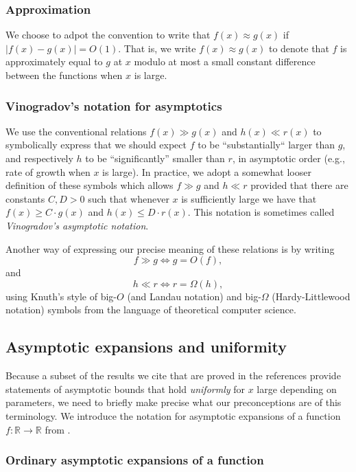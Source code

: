 \documentclass[11pt,reqno,a4letter]{article}
\numberwithin{figure}{section}
\numberwithin{table}{section}
\theoremstyle{plain}
\numberwithin{theorem}{section}
\theoremstyle{definition}
\begin{document}
\subsubsection{Approximation} 
     
We choose to adpot the convention to write that $f(x) \approx g(x)$ if $|f(x) - g(x)| = O(1)$. 
That is, we write $f(x) \approx g(x)$ to denote that $f$ is approximately equal to $g$ at $x$ modulo at most a
small constant difference between the functions when $x$ is large. 

\subsubsection{Vinogradov's notation for asymptotics} 

We use the conventional relations $f(x) \gg g(x)$ and $h(x) \ll r(x)$ to symbolically express that we should expect 
$f$ to be ``substantially`` larger than $g$, and respectively $h$ 
to be ``significantly'' smaller than $r$, in asymptotic order 
(e.g., rate of growth when $x$ is large). In practice, we adopt a somewhat looser definition of these symbols which 
allows $f \gg g$ and $h \ll r$ provided that there are constants $C, D > 0$ such that whenever $x$ is sufficiently 
large we have that $f(x) \geq C \cdot g(x)$ and $h(x) \leq D \cdot r(x)$. This notation is sometimes called 
\emph{Vinogradov's asymptotic notation}. 

Another way of expressing our precise meaning of these relations is by writing 
$$f \gg g \iff g = O(f),$$ and $$h \ll r \iff r = \Omega(h),$$ using Knuth's 
style of big-$O$ (and Landau notation) and big-$\Omega$ (Hardy-Littlewood notation)
symbols from the language of theoretical computer science. 

\subsection{Asymptotic expansions and uniformity} 

Because a subset of the results we cite that are proved in the references 
provide statements of 
asymptotic bounds that hold \emph{uniformly} for $x$ large depending on parameters, 
we need to briefly make precise what our preconceptions are of this terminology. 
We introduce the notation for asymptotic expansions of a function $f: \mathbb{R} \rightarrow \mathbb{R}$ from 
\cite[\S 2.1(iii)]{NISTHB}. 

\subsubsection{Ordinary asymptotic expansions of a function} 
\end{document}
